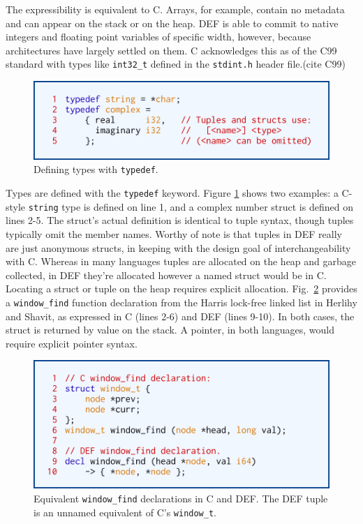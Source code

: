 The expressibility is equivalent to C.  Arrays, for example, contain no metadata and can appear on the stack or on the heap.  DEF is able to commit to native integers and floating point variables of specific width, however, because architectures have largely settled on them.  C acknowledges this as of the C99 standard with types like \texttt{int32\_t} defined in the \texttt{stdint.h} header file.(cite C99)

\begin{figure}[htbp!]
        \centering
        \includegraphics[scale=0.25]{gfx/typedef}
        \caption{Defining types with \texttt{typedef}.}
        \label{fig:typedef}
\end{figure}

Types are defined with the \texttt{typedef} keyword.  Figure \ref{fig:typedef} shows two examples: a C-style \texttt{string} type is defined on line 1, and a complex number struct is defined on lines 2-5.  The struct's actual definition is identical to tuple syntax, though tuples typically omit the member names.  Worthy of note is that tuples in DEF really are just anonymous structs, in keeping with the design goal of interchangeability with C.  Whereas in many languages tuples are allocated on the heap and garbage collected, in DEF they're allocated however a named struct would be in C.  Locating a struct or tuple on the heap requires explicit allocation.  Fig.~\ref{fig:window-find} provides a \texttt{window\_{}find} function declaration from the Harris lock-free linked list\cite{Harris} in Herlihy and Shavit,\cite{HSBook} as expressed in C (lines 2-6) and DEF (lines 9-10).  In both cases, the struct is returned by value on the stack.  A pointer, in both languages, would require explicit pointer syntax.

\begin{figure}[htbp!]
        \centering
        \includegraphics[scale=0.25]{gfx/window-find}
        \caption{Equivalent \texttt{window\_{}find} declarations in C and DEF.  The DEF tuple is an unnamed equivalent of C's \texttt{window\_{}t}.}
        \label{fig:window-find}
\end{figure}

